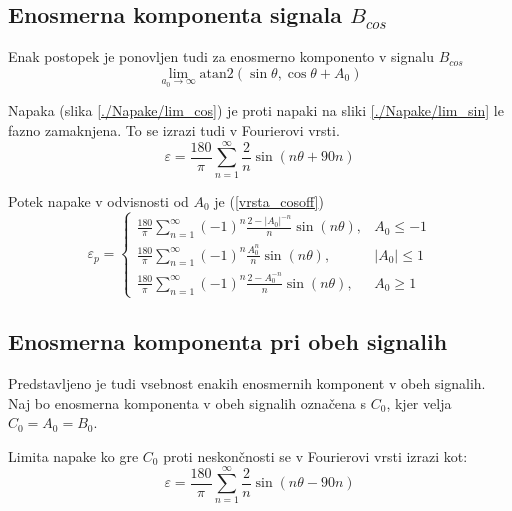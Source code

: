 \subsection{Enosmerna komponenta signala $B_{cos}$}
Enak postopek je ponovljen tudi za enosmerno komponento v signalu $B_{cos}$
\begin{equation}
\lim_{a_0 \rightarrow \infty} \mathrm{atan2}(\sin{\theta},\cos{\theta} + A_0)
\end{equation}

Napaka (slika \ref{./Napake/lim_cos}) je proti napaki na  sliki \ref{./Napake/lim_sin} le fazno zamaknjena.
To se izrazi tudi v Fourierovi vrsti.
\begin{equation}
\varepsilon = \frac{180}{\pi}\sum_{n=1}^{\infty}\frac{2}{n} \sin (n \theta+ 90 n)
\end{equation}

Potek napake v odvisnosti od $A_0$ je (\ref{vrsta_cosoff})
\begin{equation}
\label{vrsta_cosoff}
\varepsilon_p=
\begin{cases}
\frac{180}{\pi}\sum_{n=1}^{\infty}(-1)^n\frac{2-|A_0|^{-n}}{n} \sin (n \theta ), & A_0\leq -1 \\
\frac{180}{\pi}\sum_{n=1}^{\infty}(-1)^n\frac{A_0^n}{n} \sin (n \theta ), & |A_0|\leq 1 \\
\frac{180}{\pi}\sum_{n=1}^{\infty}(-1)^n\frac{2-A_0^{-n}}{n} \sin (n \theta ), & A_0\geq 1
\end{cases}
\end{equation}
\newpage
\subsection{Enosmerna komponenta pri obeh signalih}
\label{2_offseta}
Predstavljeno je tudi vsebnost enakih enosmernih komponent v obeh signalih. Naj bo enosmerna komponenta v obeh signalih označena s $C_0$, kjer velja $C_0= A_0= B_0$.

Limita napake ko gre $C_0$ proti neskončnosti se v Fourierovi vrsti izrazi kot:
\begin{equation}
\varepsilon = \frac{180}{\pi}\sum_{n=1}^{\infty}\frac{2}{n} \sin (n \theta- 90 n)
\end{equation}

